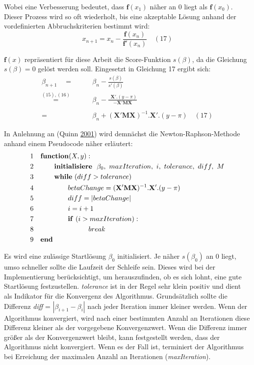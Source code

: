 \documentclass[12pt,]{article}
\begin{document}
Wobei eine Verbesserung bedeutet, dass \(\mathbf{f}(x_1)\) näher an 0
liegt als \(\mathbf{f}(x_0)\). Dieser Prozess wird so oft wiederholt,
bis eine akzeptable Lösung anhand der vordefinierten Abbruchskriterien
bestimmt wird: \[
x_{n+1} = x_n - \frac{\mathbf{f}(x_n)}{\mathbf{f'}(x_n)} \quad (17)
\]

\(\mathbf{f}(x)\) repräsentiert für diese Arbeit die Score-Funktion
\(s(\beta)\), da die Gleichung \(s(\beta) = 0\) gelöst werden soll.
Eingesetzt in Gleichung 17 ergibt sich: \[
\begin{aligned}
\beta_{n+1}\quad  = \qquad &\beta_n - \frac{s(\beta)}{s'(\beta)} \\
\mathrel{\overset{(15),(16)}{=}} \quad &\beta_n - \frac{\ \  \mathbf{X}'.(y-\pi)}{- \mathbf{X}'\mathbf{M}\mathbf{X}} \\ \\
= \qquad &\beta_n + (\mathbf{X}'\mathbf{M}\mathbf{X})^{-1}.\mathbf{X}'.(y-\pi) \quad (17)
\end{aligned} 
\]

In Anlehnung an (Quinn \protect\hyperlink{ref-quinn2001newton}{2001})
wird demnächst die Newton-Raphson-Methode anhand einem Pseudocode näher
erläutert: \[
\begin{aligned}
&1 \quad \mathbf{function}(X, y): \\
&2 \qquad \quad   \mathbf{initialisiere} \ \ \beta_0,\ maxIteration,\ i,\ tolerance,\ diff,\ M \\
&3 \qquad \quad  \mathbf{while} \ (diff > tolerance) \\
&4 \qquad \qquad \quad betaChange = (\mathbf{X}'\mathbf{M}\mathbf{X})^{-1}.\mathbf{X}'.(y-\pi) \\
&5 \qquad \qquad \quad diff = | betaChange| \\
&6 \qquad \qquad \quad      i = i + 1 \\
&7 \qquad \qquad \quad      \mathbf{if} \ (i > maxIteration): \\
&8  \qquad \qquad \qquad \qquad          break \\ 
&9 \quad \bf{end} 
\end{aligned}
\]

Es wird eine zulässige Startlösung \(\beta_0\) initialisiert. Je näher
\(s(\beta_0)\) an 0 liegt, umso schneller sollte die Laufzeit der
Schleife sein. Dieses wird bei der Implementierung berücksichtigt, um
herauszufinden, ob es sich lohnt, eine gute Startlösung festzustellen.
\emph{tolerance} ist in der Regel sehr klein positiv und dient als
Indikator für die Konvergenz des Algorithmus. Grundsätzlich sollte die
Differenz \emph{diff} = \(|\beta_{i+1} - \beta_i|\) nach jeder Iteration
immer kleiner werden. Wenn der Algorithmus konvergiert, wird nach einer
bestimmten Anzahl an Iterationen diese Differenz kleiner als der
vorgegebene Konvergenzwert. Wenn die Differenz immer größer als der
Konvergenzwert bleibt, kann festgestellt werden, dass der Algorithmus
nicht konvergiert. Wenn es der Fall ist, terminiert der Algorithmus bei
Erreichung der maximalen Anzahl an Iterationen (\emph{maxIteration}).
\end{document}
